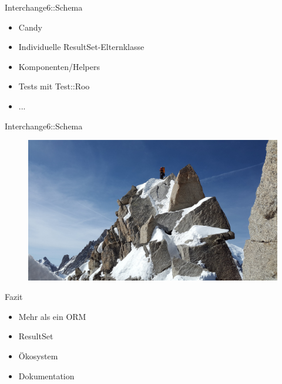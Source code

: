 \begin{frame}{Interchange6::Schema}
\begin{itemize}
\item Candy
\item Individuelle ResultSet-Elternklasse
\item Komponenten/Helpers
\item Tests mit Test::Roo
\item ...
\end{itemize}
\end{frame}


\begin{frame}{Interchange6::Schema}
\begin{figure}[!ht]
\centering
\includegraphics[width=1\linewidth]{img/rocky-ridge.jpg}
\end{figure}
\end{frame}

\begin{frame}{Fazit}
  \begin{itemize}
  \item Mehr als ein ORM
  \item ResultSet
  \item Ökosystem
  \item Dokumentation
  \end{itemize}
\end{frame}


